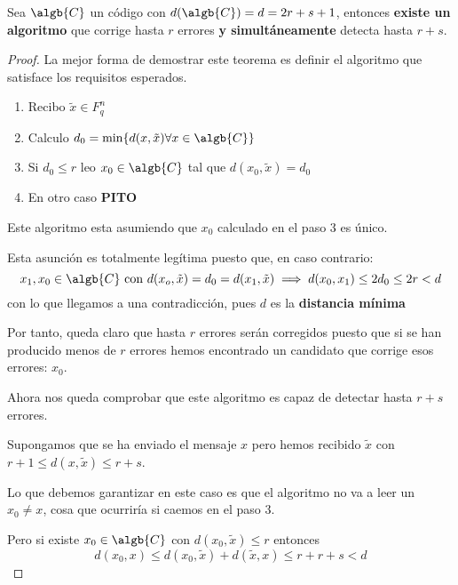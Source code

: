 \begin{theorem}\label{theorem:Codigo_detector_corrector}
Sea $\algb{C}$ un código con $d(\algb{C}) = d=2r+s+1$, entonces \textbf{existe un algoritmo} que corrige hasta $r$ errores \textbf{y simultáneamente} detecta hasta $r+s$.
\end{theorem}
\begin{proof}
La mejor forma de demostrar este teorema es definir el algoritmo que satisface los requisitos esperados.
\begin{enumerate}
\item Recibo $\tilde{x} \in F_q^n$
\item Calculo $d_0 = \min\{d(x,\tilde{x}) \forall x \in \algb{C}\}$
\item Si $d_0 \leq r$ leo $x_0 \in \algb{C}$ tal que $d(x_0,\tilde{x})=d_0$
\item En otro caso \textbf{PITO}
\end{enumerate}

Este algoritmo esta asumiendo que $x_0$ calculado en el paso 3 es único.

Esta asunción es totalmente legítima puesto que, en caso contrario:
\[x_1,x_0 \in \algb{C} \text{ con } d(x_o,\tilde{x})=d_0=d(x_1,\tilde{x}) \implies d(x_0,x_1)\leq 2d_0 \leq 2r < d\]
con lo que llegamos a una contradicción, pues $d$ es la \textbf{distancia mínima}

Por tanto, queda claro que hasta $r$ errores serán corregidos puesto que si se han producido menos de $r$ errores hemos encontrado un candidato que corrige esos errores: $x_0$.

Ahora nos queda comprobar que este algoritmo es capaz de detectar hasta $r+s$ errores.

Supongamos que se ha enviado el mensaje $x$ pero hemos recibido $\tilde{x}$ con $r+1\leq d(x,\tilde{x})\leq r+s$.

Lo que debemos garantizar en este caso es que el algoritmo no va a leer un $x_0 \neq x$, cosa que ocurriría si caemos en el paso 3.

Pero si existe $x_0 \in \algb{C}$ con $d(x_0,\tilde{x})\leq r$ entonces
\[d(x_0,x)\leq d(x_0,\tilde{x})+d(\tilde{x},x) \leq r+r+s < d\]

\end{proof}
